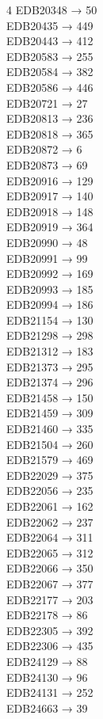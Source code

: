 \begin{multicols}{4}
EDB20348 → 50\\
EDB20435 → 449\\
EDB20443 → 412\\
EDB20583 → 255\\
EDB20584 → 382\\
EDB20586 → 446\\
EDB20721 → 27\\
EDB20813 → 236\\
EDB20818 → 365\\
EDB20872 → 6\\
EDB20873 → 69\\
EDB20916 → 129\\
EDB20917 → 140\\
EDB20918 → 148\\
EDB20919 → 364\\
EDB20990 → 48\\
EDB20991 → 99\\
EDB20992 → 169\\
EDB20993 → 185\\
EDB20994 → 186\\
EDB21154 → 130\\
EDB21298 → 298\\
EDB21312 → 183\\
EDB21373 → 295\\
EDB21374 → 296\\
EDB21458 → 150\\
EDB21459 → 309\\
EDB21460 → 335\\
EDB21504 → 260\\
EDB21579 → 469\\
EDB22029 → 375\\
EDB22056 → 235\\
EDB22061 → 162\\
EDB22062 → 237\\
EDB22064 → 311\\
EDB22065 → 312\\
EDB22066 → 350\\
EDB22067 → 377\\
EDB22177 → 203\\
EDB22178 → 86\\
EDB22305 → 392\\
EDB22306 → 435\\
EDB24129 → 88\\
EDB24130 → 96\\
EDB24131 → 252\\
EDB24663 → 39\\

\end{multicols}
